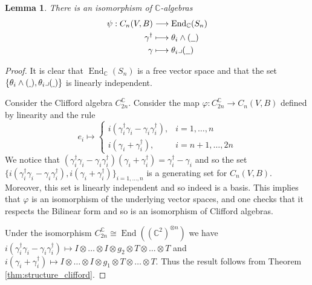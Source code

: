 \documentclass[12pt]{article}
\theoremstyle{plain}
\newtheorem{lemma}[thm]{Lemma}
\theoremstyle{definition}
\newcommand{\bb}[1]{\mathbb{#1}}
\newcommand{\und}[1]{\underline{\hspace{#1 cm}}}
\newcommand{\lto}{\longrightarrow}
\begin{document}
\begin{lemma}
	There is an isomorphism of $\bb{C}$-algebras
	\begin{align*}
		\psi: C_n(V,B) &\lto \operatorname{End}_{\bb{C}}(S_n)\\
		\gamma^\dagger &\longmapsto \theta_i \wedge (\und{0.2})\\
		\gamma &\longmapsto \theta_i  \lrcorner( \und{0.2})
	\end{align*}
\end{lemma}
\begin{proof}
	It is clear that $\operatorname{End}_{\bb{C}}(S_n)$ is a free vector space and that the set $\{ \theta_i \wedge (\und{0.1}), \theta_i \lrcorner(\und{0.1}) \}$ is linearly independent.
	
	Consider the Clifford algebra $C_{2n}^{\bb{C}}$. Consider the map $\varphi: C_{2n}^{\bb{C}} \lto C_n(V,B)$ defined by linearity and the rule
	\begin{equation}
		e_i \longmapsto
		\begin{cases}
			i(\gamma_i^\dagger \gamma_i - \gamma_i \gamma_i^\dagger),&i = 1, \ldots, n\\
			i(\gamma_i + \gamma_i^\dagger), &i = n+1, \ldots, 2n
			\end{cases}
		\end{equation}
	We notice that $(\gamma_i^\dagger \gamma_i - \gamma_i \gamma_i^\dagger)(\gamma_i + \gamma_i^\dagger) = \gamma_i^\dagger - \gamma_i$ and so the set $\{ i(\gamma_i^\dagger \gamma_i - \gamma_i \gamma_i^\dagger), i(\gamma_i + \gamma^\dagger_i) \}_{i = 1, \ldots, n}$ is a generating set for $C_n(V,B)$. Moreover, this set is linearly independent and so indeed is a basis. This implies that $\varphi$ is an isomorphism of the underlying vector spaces, and one checks that it respects the Bilinear form and so is an isomorphism of Clifford algebras.
	
	Under the isomorphism $C_{2n}^{\bb{C}} \cong \operatorname{End}((\bb{C}^2)^{\otimes n})$ we have $i(\gamma_i^\dagger \gamma_i - \gamma_i \gamma_i^\dagger) \longmapsto I \otimes \ldots \otimes I \otimes g_{2} \otimes T \otimes \ldots \otimes T$ and $i(\gamma_i + \gamma_i^\dagger) \longmapsto I \otimes \ldots \otimes I \otimes g_{1} \otimes T \otimes \ldots \otimes T$. Thus the result follows from Theorem \ref{thm:structure_clifford}.
	\end{proof}
\end{document}
